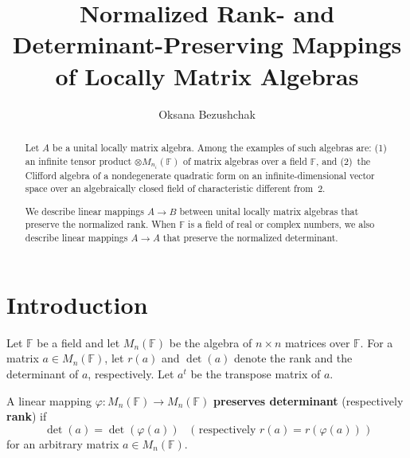 \documentclass[12pt]{amsart}
\begin{document}
	
	{\fontsize{12pt}{17pt}\selectfont
		\title{Normalized Rank- and Determinant-Preserving Mappings of Locally Matrix Algebras}
		
		
		\author{Oksana Bezushchak}
		\address{Oksana Bezushchak: Faculty of Mechanics and Mathematics, Taras Shevchenko National University of Kyiv, Volodymyrska, 60, Kyiv 01033, Ukraine}
		
		
		
		
		

		
		\begin{abstract} Let $A$ be a unital locally matrix algebra. Among the examples of such algebras are: (1) an infinite tensor product  $\otimes M_{n_i}(\mathbb{F})$ of matrix algebras over a field $\mathbb{F}$, and (2)~the Clifford algebra of a nondegenerate quadratic form on an infinite-dimensional vector space over an algebraically closed field of characteristic different from~$2$.


We describe linear mappings $A \to B$ between  unital locally matrix algebras that preserve the normalized rank. When $\mathbb{F}$ is a field of real or complex numbers,  we also describe linear mappings  $A \to A$ that preserve the normalized determinant. 	\end{abstract}
		
		
				\maketitle
		
		\section{Introduction}
		
	
		 
	
	Let $\mathbb{F}$ be a field and let $M_n(\mathbb{F})$ be the algebra of $n \times n$ matrices over $\mathbb{F}$.  
	For a matrix $a \in M_n(\mathbb{F})$, let $r(a)$ and $\det(a)$ denote the rank and the determinant of $a$, respectively.  
	Let $a^t$ be the transpose matrix of $a$.
	
 
	
	A linear mapping $\varphi \colon M_n(\mathbb{F}) \to M_n(\mathbb{F})$ \textbf{preserves determinant} (respectively \textbf{rank}) if  
	\[
\det(a) = \det(\varphi(a)) \quad \text{( respectively } 	r(a) = r(\varphi(a))  \text{ )}
	\]
	for an arbitrary matrix $a \in M_n(\mathbb{F})$.
	
}
\end{document}
